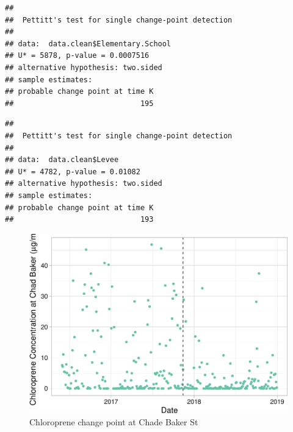 \documentclass[12pt,]{article}
\newenvironment{Shaded}{\begin{snugshade}}{\end{snugshade}}
\newcommand{\KeywordTok}[1]{\textcolor[rgb]{0.13,0.29,0.53}{\textbf{#1}}}
\newcommand{\OperatorTok}[1]{\textcolor[rgb]{0.81,0.36,0.00}{\textbf{#1}}}
\newcommand{\NormalTok}[1]{#1}
\begin{document}
\begin{verbatim}
## 
##  Pettitt's test for single change-point detection
## 
## data:  data.clean$Elementary.School
## U* = 5878, p-value = 0.0007516
## alternative hypothesis: two.sided
## sample estimates:
## probable change point at time K 
##                             195
\end{verbatim}

\begin{Shaded}
\end{Shaded}

\begin{verbatim}
## 
##  Pettitt's test for single change-point detection
## 
## data:  data.clean$Levee
## U* = 4782, p-value = 0.01082
## alternative hypothesis: two.sided
## sample estimates:
## probable change point at time K 
##                             193
\end{verbatim}

\begin{figure}
\centering
\includegraphics{Li_ENV872_Project_files/figure-latex/unnamed-chunk-9-1.pdf}
\caption{Chloroprene change point at Chade Baker St}
\end{figure}
\end{document}
